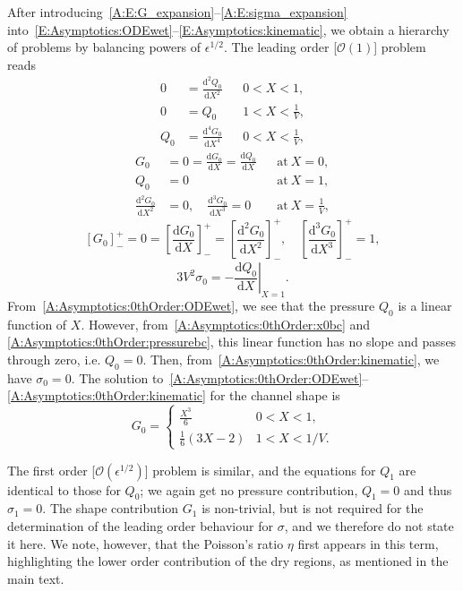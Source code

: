 \documentclass{jfm}
\newcommand{\dd}[2]{\frac{\mathrm{d} #1}{\mathrm{d} #2}}
\newcommand{\order}[1]{\mathcal{O}\left(#1\right)}
\newcommand{\poisson}{\eta} %
\begin{document}
After introducing~\eqref{A:E:G_expansion}--\eqref{A:E:sigma_expansion} into~\eqref{E:Asymptotics:ODEwet}--\eqref{E:Asymptotics:kinematic}, we obtain a hierarchy of problems by balancing powers of $\epsilon^{1/2}$. The leading order [$\order{1}$] problem reads
\begin{align}
0&= \dd{^2Q_0}{X^2} & &0 < X<1,\label{A:Asymptotics:0thOrder:ODEwet}\\
0&= Q_0  & &1 < X< \frac{1}{V},\\
Q_0 &= \dd{^4 G_0}{X^4} & & 0 < X < \frac{1}{V},
\end{align}
\begin{align}
G_0 &= 0 = \dd{G_0}{X}= \dd{Q_0}{X} & &\text{at}~X = 0,\label{A:Asymptotics:0thOrder:x0bc}\\
Q_0 &=0 & &\text{at}~X = 1,\label{A:Asymptotics:0thOrder:pressurebc}\\
\dd{^2 G_0}{X^2}&=0, \quad  \dd{^3 G_0}{X^3} = 0 & &\text{at}~X = \frac{1}{V},
\end{align}
\begin{equation}
\left[G_0\right]_-^+ =0 = \left[\dd{G_0}{X}\right]_-^+ = \left[\dd{^2 G_0}{X^2}\right]_-^+, \quad  \left[\dd{^3 G_0}{X^3}\right]_-^+ = 1,
\end{equation}
\begin{equation}\label{A:Asymptotics:0thOrder:kinematic}
3V^2 \sigma_0 = -\left.\dd{Q_0}{X}\right|_{X=1}.
\end{equation}
From~\eqref{A:Asymptotics:0thOrder:ODEwet}, we see that the pressure $Q_0$ is a linear function of $X$. However, from~\eqref{A:Asymptotics:0thOrder:x0bc} and \eqref{A:Asymptotics:0thOrder:pressurebc}, this linear function has no slope and passes through zero, i.e. $Q_0 = 0$. Then, from~\eqref{A:Asymptotics:0thOrder:kinematic}, we have $\sigma_0 = 0$. The solution to~\eqref{A:Asymptotics:0thOrder:ODEwet}--\eqref{A:Asymptotics:0thOrder:kinematic} for the channel shape is
\begin{equation}\label{A:Asymptotics:0thOrder:solution}
G_0  =\begin{cases}
\frac{X^3}{6} & 0 < X < 1,\\
\frac{1}{6}(3X-2) & 1 < X < 1/V.
\end{cases}
\end{equation}

The first order [$\order{\epsilon^{1/2}}$] problem is similar, and the equations for $Q_1$ are identical to those for $Q_0$; we again get no pressure contribution, $Q_1 = 0$ and thus $\sigma_1 = 0$. The shape contribution $G_1$ is non-trivial, but is not required for the determination of the leading order behaviour for $\sigma$, and we therefore do not state it here. We note, however, that the Poisson's ratio $\poisson$ first appears in this term, highlighting the lower order contribution of the dry regions, as mentioned in the main text.
\end{document}
